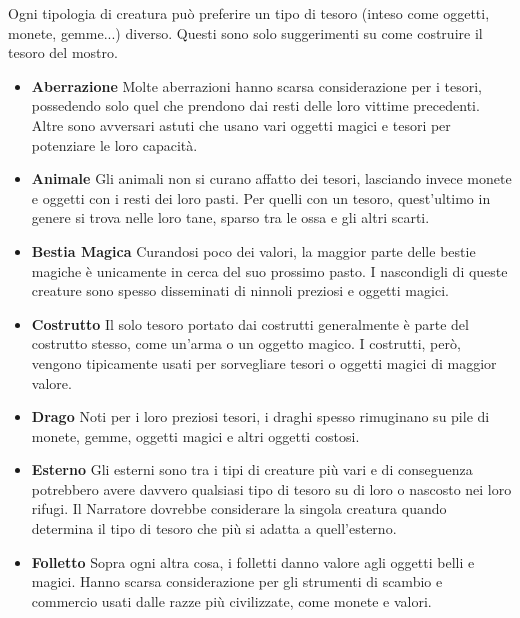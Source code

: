 \begin{multicols}{2}
	Ogni tipologia di creatura può preferire un tipo di tesoro (inteso come oggetti, monete, gemme...) diverso. Questi sono solo suggerimenti su come costruire il tesoro del mostro.

	\medskip

	\begin{itemize}

		\item \textbf{Aberrazione}
		Molte aberrazioni hanno scarsa considerazione per i tesori, possedendo solo quel che prendono dai resti delle loro vittime precedenti. Altre sono avversari astuti che usano vari oggetti magici e tesori per potenziare le loro capacità.

		\item \textbf{Animale}
		Gli animali non si curano affatto dei tesori, lasciando invece monete e oggetti con i resti dei loro pasti. Per quelli con un tesoro, quest'ultimo in genere si trova nelle loro tane, sparso tra le ossa e gli altri scarti.

		\item \textbf{Bestia Magica}
		Curandosi poco dei valori, la maggior parte delle bestie magiche è unicamente in cerca del suo prossimo pasto. I nascondigli di queste creature sono spesso disseminati di ninnoli preziosi e oggetti magici.

		\item \textbf{Costrutto}
		Il solo tesoro portato dai costrutti generalmente è parte del costrutto stesso, come un'arma o un oggetto magico. I costrutti, però, vengono tipicamente usati per sorvegliare tesori o oggetti magici di maggior valore.

		\item \textbf{Drago}
		Noti per i loro preziosi tesori, i draghi spesso rimuginano su pile di monete, gemme, oggetti magici e altri oggetti costosi.

		\item \textbf{Esterno}
		Gli esterni sono tra i tipi di creature più vari e di conseguenza potrebbero avere davvero qualsiasi tipo di tesoro su di loro o nascosto nei loro rifugi. Il Narratore dovrebbe considerare la singola creatura quando determina il tipo di tesoro che più si adatta a quell'esterno.

		\item \textbf{Folletto}
		Sopra ogni altra cosa, i folletti danno valore agli oggetti belli e magici. Hanno scarsa considerazione per gli strumenti di scambio e commercio usati dalle razze più civilizzate, come monete e valori.


\end{itemize}
\end{multicols}
